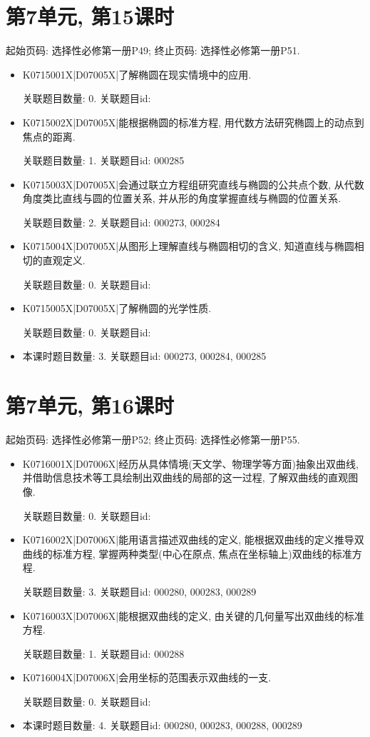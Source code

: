 \section*{第7单元, 第15课时}
起始页码: 选择性必修第一册P49; 终止页码: 选择性必修第一册P51.
\begin{itemize}
\item K0715001X|D07005X|了解椭圆在现实情境中的应用.

关联题目数量: 0. 关联题目id: 

\item K0715002X|D07005X|能根据椭圆的标准方程, 用代数方法研究椭圆上的动点到焦点的距离.

关联题目数量: 1. 关联题目id: 000285

\item K0715003X|D07005X|会通过联立方程组研究直线与椭圆的公共点个数, 从代数角度类比直线与圆的位置关系, 并从形的角度掌握直线与椭圆的位置关系.

关联题目数量: 2. 关联题目id: 000273, 000284

\item K0715004X|D07005X|从图形上理解直线与椭圆相切的含义, 知道直线与椭圆相切的直观定义.

关联题目数量: 0. 关联题目id: 

\item K0715005X|D07005X|了解椭圆的光学性质.

关联题目数量: 0. 关联题目id: 

\item 本课时题目数量: 3. 关联题目id: 000273, 000284, 000285

\end{itemize}

\section*{第7单元, 第16课时}
起始页码: 选择性必修第一册P52; 终止页码: 选择性必修第一册P55.
\begin{itemize}
\item K0716001X|D07006X|经历从具体情境(天文学、物理学等方面)抽象出双曲线, 并借助信息技术等工具绘制出双曲线的局部的这一过程, 了解双曲线的直观图像.

关联题目数量: 0. 关联题目id: 

\item K0716002X|D07006X|能用语言描述双曲线的定义, 能根据双曲线的定义推导双曲线的标准方程, 掌握两种类型(中心在原点, 焦点在坐标轴上)双曲线的标准方程.

关联题目数量: 3. 关联题目id: 000280, 000283, 000289

\item K0716003X|D07006X|能根据双曲线的定义, 由关键的几何量写出双曲线的标准方程.

关联题目数量: 1. 关联题目id: 000288

\item K0716004X|D07006X|会用坐标的范围表示双曲线的一支.

关联题目数量: 0. 关联题目id: 

\item 本课时题目数量: 4. 关联题目id: 000280, 000283, 000288, 000289

\end{itemize}

